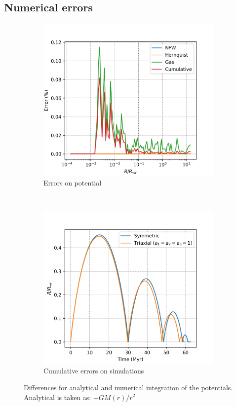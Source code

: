 	\subsection{Numerical errors}
	\begin{figure}[h]
		\centering
		\begin{subfigure}[b]{0.49\textwidth}
			\includegraphics[width = \textwidth]{"../Files/Week 7/error"}
			\caption{Errors on potential}
			\label{fig: potentialErrors}
		\end{subfigure}
		~ 
		\begin{subfigure}[b]{0.49\textwidth}
			\includegraphics[width=\textwidth]{"../Files/Week 7/symmetric_triaxial"}
			\caption{Cumulative errors on simulations}
			\label{fig: simulationErrors}
		\end{subfigure}
		\caption{Differences for analytical and numerical integration of the potentials. Analytical is taken as: $-GM(r) / r^2$}
		\label{fig: numericalErrors}
	\end{figure}
	
